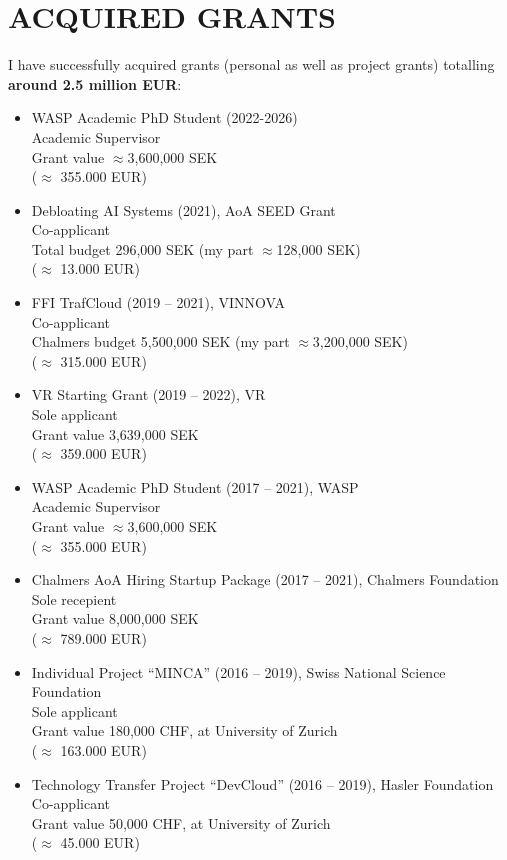 \documentclass[paper=letter,fontsize=11pt]{scrartcl} %
\newcommand{\NewPart}[2]{\section*{\uppercase{#1} #2}}
\begin{document}
\NewPart{Acquired Grants}{}

I have successfully acquired grants (personal as well as project grants) totalling \textbf{around 2.5 million EUR}:

\begin{itemize}
  \item WASP Academic PhD Student (2022-2026)\\
  Academic Supervisor\\
  Grant value $\approx$3,600,000 SEK\\
  ($\approx$ 355.000 EUR)
  \item Debloating AI Systems (2021), AoA SEED Grant\\
  Co-applicant\\
  Total budget 296,000 SEK (my part $\approx$128,000 SEK)\\
  ($\approx$ 13.000 EUR)
	\item FFI TrafCloud (2019 -- 2021), VINNOVA\\
	Co-applicant\\
	Chalmers budget 5,500,000 SEK (my part $\approx$3,200,000 SEK)\\
  ($\approx$ 315.000 EUR)
  \item VR Starting Grant (2019 -- 2022), VR\\
  Sole applicant\\
	Grant value 3,639,000 SEK\\
  ($\approx$ 359.000 EUR)
  \item WASP Academic PhD Student (2017 -- 2021), WASP\\
  Academic Supervisor\\
	Grant value $\approx$3,600,000 SEK\\
  ($\approx$ 355.000 EUR)
  \item Chalmers AoA Hiring Startup Package (2017 -- 2021), Chalmers Foundation\\
	Sole recepient\\
  Grant value 8,000,000 SEK\\
  ($\approx$ 789.000 EUR)
  \item Individual Project ``MINCA'' (2016 -- 2019), Swiss National Science Foundation\\
  Sole applicant \\
  Grant value 180,000 CHF, at University of Zurich\\
  ($\approx$ 163.000 EUR)
  \item Technology Transfer Project ``DevCloud'' (2016 -- 2019), Hasler Foundation\\
  Co-applicant \\
  Grant value 50,000 CHF, at University of Zurich\\
  ($\approx$ 45.000 EUR)
\end{itemize}
\end{document}
